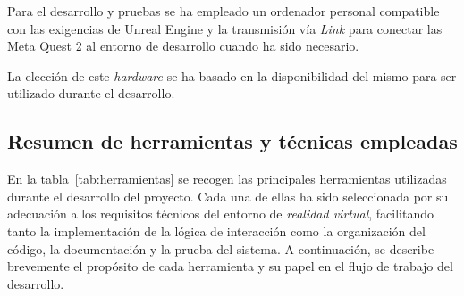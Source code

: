 Para el desarrollo y pruebas se ha empleado un ordenador personal compatible con las exigencias de Unreal Engine y la transmisión vía \textit{Link} para conectar las Meta Quest 2 al entorno de desarrollo cuando ha sido necesario.

La elección de este \textit{hardware} se ha basado en la disponibilidad del mismo para ser utilizado durante el desarrollo.

\subsection{Resumen de herramientas y técnicas empleadas}
En la tabla~\ref{tab:herramientas} se recogen las principales herramientas utilizadas durante el desarrollo del proyecto. Cada una de ellas ha sido seleccionada por su adecuación a los requisitos técnicos del entorno de \textit{realidad virtual}, facilitando tanto la implementación de la lógica de interacción como la organización del código, la documentación y la prueba del sistema. A continuación, se describe brevemente el propósito de cada herramienta y su papel en el flujo de trabajo del desarrollo.


